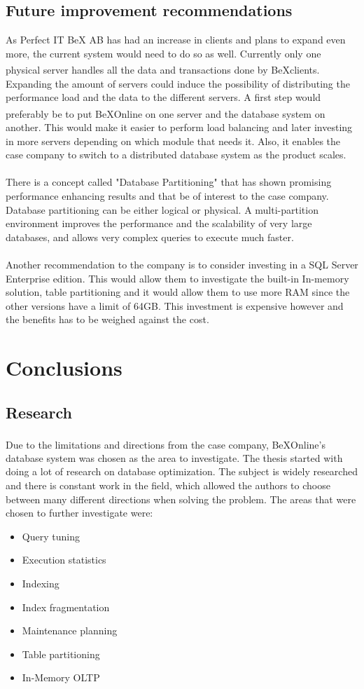 \documentclass{cslthse-msc}
\newcommand{\bex}{BeX\textsuperscript{\textregistered}}
\begin{document}
\section{Future improvement recommendations}
As Perfect IT BeX AB has had an increase in clients and plans to expand even more, the current system would need to do so as well. Currently only one physical server handles all the data and transactions done by \bex clients. Expanding the amount of servers could induce the possibility of distributing the performance load and the data to the different servers. A first step would preferably be to put \bex Online on one server and the database system on another. This would make it easier to perform load balancing and later investing in more servers depending on which module that needs it. Also, it enables the case company to switch to a distributed database system as the product scales.\\\\
There is a concept called "Database Partitioning" that has shown promising performance enhancing results and that be of interest to the case company. Database partitioning can be either logical or physical. A multi-partition environment improves the performance and the scalability of very large databases, and allows very complex queries to execute much faster.\\\\
Another recommendation to the company is to consider investing in a SQL Server Enterprise edition. This would allow them to investigate the built-in In-memory solution, table partitioning and it would allow them to use more RAM since the other versions have a limit of 64GB. This investment is expensive however and the benefits has to be weighed against the cost.

\chapter{Conclusions}\label{sec:conclusions}
\section{Research}
Due to the limitations and directions from the case company, \bex Online's database system was chosen as the area to investigate. The thesis started with doing a lot of research on database optimization. The subject is widely researched and there is constant work in the field, which allowed the authors to choose between many different directions when solving the problem. The areas that were chosen to further investigate were:
\begin{itemize}
\item Query tuning
\item Execution statistics
\item Indexing
\item Index fragmentation
\item Maintenance planning
\item Table partitioning
\item In-Memory OLTP
\end{itemize}
\end{document}
